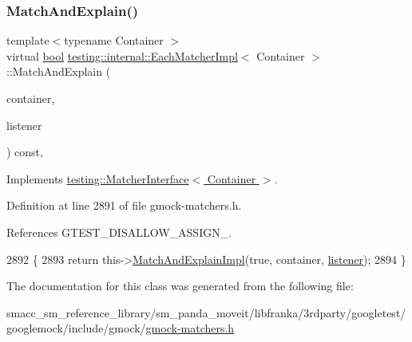 \subsubsection{\texorpdfstring{Match\+And\+Explain()}{MatchAndExplain()}}
{\footnotesize\ttfamily template$<$typename Container $>$ \\
virtual \hyperlink{classbool}{bool} \hyperlink{classtesting_1_1internal_1_1EachMatcherImpl}{testing\+::internal\+::\+Each\+Matcher\+Impl}$<$ Container $>$\+::Match\+And\+Explain (\begin{DoxyParamCaption}\item[{Container}]{container,  }\item[{\hyperlink{classtesting_1_1MatchResultListener}{Match\+Result\+Listener} $\ast$}]{listener }\end{DoxyParamCaption}) const\hspace{0.3cm}{\ttfamily [inline]}, {\ttfamily [virtual]}}



Implements \hyperlink{classtesting_1_1MatcherInterface_a296b43607cd99d60365f0e6a762777cf}{testing\+::\+Matcher\+Interface$<$ Container $>$}.



Definition at line 2891 of file gmock-\/matchers.\+h.



References G\+T\+E\+S\+T\+\_\+\+D\+I\+S\+A\+L\+L\+O\+W\+\_\+\+A\+S\+S\+I\+G\+N\+\_\+.


\begin{DoxyCode}
2892                                                                     \{
2893     \textcolor{keywordflow}{return} this->\hyperlink{classtesting_1_1internal_1_1QuantifierMatcherImpl_ab8f64532b70f47fc60f7983ebe5cbfc6}{MatchAndExplainImpl}(\textcolor{keyword}{true}, container, 
      \hyperlink{namespaceinteractive__marker_a0e579ab555212bb5e2c9f8a675b7618a}{listener});
2894   \}
\end{DoxyCode}


The documentation for this class was generated from the following file\+:\begin{DoxyCompactItemize}
\item 
smacc\+\_\+sm\+\_\+reference\+\_\+library/sm\+\_\+panda\+\_\+moveit/libfranka/3rdparty/googletest/googlemock/include/gmock/\hyperlink{gmock-matchers_8h}{gmock-\/matchers.\+h}\end{DoxyCompactItemize}
